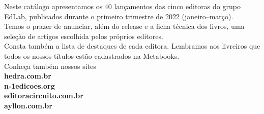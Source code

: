 \hspace*{-.5cm}\parbox{180pt}{\raggedright 
Neste catálogo apresentamos os 40 lançamentos das cinco editoras do grupo EdLab, publicados durante o primeiro trimestre de 2022 (janeiro--março).\\
\smallskip
Temos o prazer de anunciar, além do release e a ficha técnica dos livros, uma seleção de artigos escolhida pelos próprios editores.\\
\smallskip
Consta também a lista de destaques de cada editora. Lembramos aos livreiros que todos os nossos títulos estão cadastrados na Metabooks.\\
\bigskip
Conheça também nossos sites\\
\textbf{hedra.com.br}\\
\textbf{n-1edicoes.org}\\
\textbf{editoracircuito.com.br}\\
\textbf{ayllon.com.br}
}

\pagebreak

